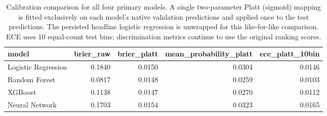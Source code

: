 \begin{table}[htbp]
\centering
\caption{Calibration comparison for all four primary models. A single two-parameter Platt (sigmoid) mapping is fitted exclusively on each model's native validation predictions and applied once to the test predictions. The persisted headline logistic regression is unwrapped for this like-for-like comparison. ECE uses 10 equal-count test bins; discrimination metrics continue to use the original ranking scores.}
\label{tab:final_calibration_comparison}
\small
\begin{tabular}{lrrrr}
\toprule
model & brier\_raw & brier\_platt & mean\_probability\_platt & ece\_platt\_10bin \\
\midrule
Logistic Regression & 0.1840 & 0.0150 & 0.0304 & 0.0146 \\
Random Forest & 0.0817 & 0.0148 & 0.0259 & 0.0103 \\
XGBoost & 0.1138 & 0.0147 & 0.0270 & 0.0112 \\
Neural Network & 0.1703 & 0.0154 & 0.0323 & 0.0165 \\
\bottomrule
\end{tabular}
\end{table}
